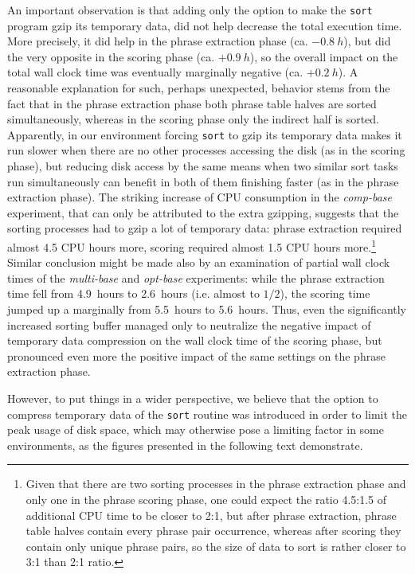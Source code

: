 An important observation is that adding only the option to make the \texttt{sort} program gzip
its temporary data, did not help decrease the total execution time.
More precisely, it did help in the phrase extraction phase (ca. $-0.8~h$), but did the very opposite
in the scoring phase (ca. $+0.9~h$), so the overall impact on the total wall clock time was eventually
marginally negative (ca. $+0.2~h$).
A reasonable explanation for such, perhaps unexpected, behavior stems from the fact that in the phrase
extraction phase both phrase table halves are sorted simultaneously, whereas in the scoring phase
only the indirect half is sorted.
Apparently, in our environment forcing \texttt{sort} to gzip its temporary data makes it run
slower when there are no other processes accessing the disk (as in the scoring phase), but reducing
disk access by the same means when two similar sort tasks run simultaneously can benefit
in both of them finishing faster (as in the phrase extraction phase).
The striking increase of CPU consumption in the \emph{comp-base} experiment, that can only be
attributed to the extra gzipping, suggests that the sorting processes had to gzip a lot of
temporary data:
phrase extraction required almost 4.5 CPU hours more, scoring required almost 1.5 CPU hours
more.\footnote{Given that there are two sorting processes in the phrase extraction phase and
only one in the phrase scoring phase, one could expect the ratio
4.5:1.5 of additional CPU time to be closer to 2:1, but after phrase extraction, phrase table halves
contain every phrase pair occurrence, whereas after scoring they contain only unique phrase pairs,
so the size of data to sort is rather closer to 3:1 than 2:1 ratio.}
Similar conclusion might be made also by an examination of partial wall clock times of the \emph{multi-base}
and \emph{opt-base} experiments: while the phrase extraction time fell from 4.9~hours to 2.6~hours
(i.e. almost to $1/2$), the scoring time jumped up a marginally from 5.5~hours to 5.6~hours.
Thus, even the significantly increased sorting buffer managed only to neutralize the negative impact of
temporary data compression on the wall clock time of the scoring phase, but pronounced even more
the positive impact of the same settings on the phrase extraction phase.

However, to put things in a wider perspective, we believe that the option to compress temporary data of
the \texttt{sort} routine was introduced in order to limit the peak usage of disk space, which may
otherwise pose a limiting factor in some environments, as the figures presented in the following text
demonstrate.

